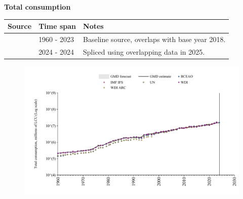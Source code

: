\documentclass[12pt,a4paper,landscape]{article}
\begin{document}
\begin{adjustbox}{max totalsize={\paperwidth}{\paperheight},center}
\begin{minipage}[t][\textheight][t]{\textwidth}
\vspace*{0.5cm}
{}
\begin{center}
{\Large\bfseries Total consumption}
\end{center}
\vspace{0.5cm}
\begin{table}[H]
\centering
\small
\begin{tabular}{|l|l|l|}
\hline
\textbf{Source} & \textbf{Time span} & \textbf{Notes} \\
\hline
\rowcolor{white}\cite{WDI}& 1960 - 2023 &Baseline source, overlaps with base year 2018. \\
\rowcolor{lightgray}\cite{BCEAO}& 2024 - 2024 &Spliced using overlapping data in 2025. \\
\hline
\end{tabular}
\end{table}
\begin{figure}[H]
\centering
\includegraphics[width=\textwidth,height=0.6\textheight,keepaspectratio]{graphs/SEN_cons.pdf}
\end{figure}
\end{minipage}
\end{adjustbox}
\end{document}
